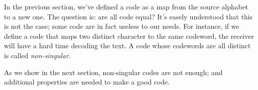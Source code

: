 \documentclass{subfiles}
\begin{document}
    In the previous section, we've defined a code as a map from the source alphabet 
        to a new one. The question is: are all code equal? 
        It's easely understood that this is not the case; 
        some code are in fact useless to our needs.
        For instance, if we define a code that maps two distinct character to the same 
        codeword, the receiver will have a hard time decoding the text.
        A code whose codewords are all distinct is called \emph{non-singular}. 
        
        As we show in the next section, non-singular codes are not enough; 
            and additional properties are needed to make a good code.
\end{document}
